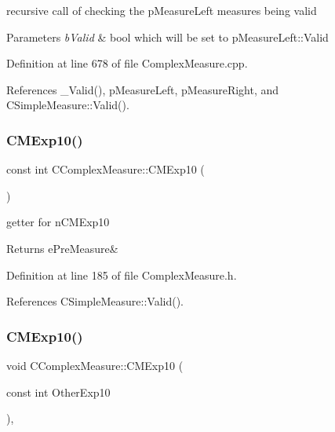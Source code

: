 recursive call of checking the p\+Measure\+Left measures being valid 


\begin{DoxyParams}{Parameters}
{\em b\+Valid} & bool which will be set to p\+Measure\+Left\+::\+Valid \\
\hline
\end{DoxyParams}


Definition at line 678 of file Complex\+Measure.\+cpp.



References \+\_\+\+Valid(), p\+Measure\+Left, p\+Measure\+Right, and C\+Simple\+Measure\+::\+Valid().

\mbox{\label{classCComplexMeasure_a06355541d6d9b843b9d68156a0297f51}} 
\subsubsection{\texorpdfstring{C\+M\+Exp10()}{CMExp10()}\hspace{0.1cm}{\footnotesize\ttfamily [1/2]}}
{\footnotesize\ttfamily const int C\+Complex\+Measure\+::\+C\+M\+Exp10 (\begin{DoxyParamCaption}{ }\end{DoxyParamCaption})\hspace{0.3cm}{\ttfamily [inline]}}



getter for n\+C\+M\+Exp10 

\begin{DoxyReturn}{Returns}
e\+Pre\+Measure\& 
\end{DoxyReturn}


Definition at line 185 of file Complex\+Measure.\+h.



References C\+Simple\+Measure\+::\+Valid().

\mbox{\label{classCComplexMeasure_aaa6f3cf75ee0dd2a880adaaf43e81168}} 
\subsubsection{\texorpdfstring{C\+M\+Exp10()}{CMExp10()}\hspace{0.1cm}{\footnotesize\ttfamily [2/2]}}
{\footnotesize\ttfamily void C\+Complex\+Measure\+::\+C\+M\+Exp10 (\begin{DoxyParamCaption}\item[{const int}]{Other\+Exp10 }\end{DoxyParamCaption})\hspace{0.3cm}{\ttfamily [inline]}, {\ttfamily [protected]}}




